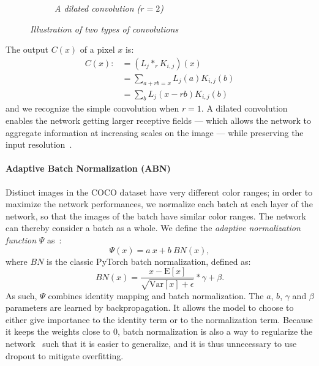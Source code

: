 \documentclass{article}
\begin{document}
\begin{figure}[!ht]
\begin{subfigure}{.49\linewidth}
                    \caption{\textit{A dilated convolution ($r=2$)}}
                    \label{fig:conv-dilated}
                \end{subfigure}
                \caption{\textit{Illustration of two types of convolutions}}
            \end{figure}

            \noindent The output $C(x)$ of a pixel $x$ is:
            \begin{align*}
            C(x):& = (L_j*_r K_{i,j})(x) \\
                 & = \sum_{a+rb=x}L_j(a)K_{i,j}(b) \\
                 & = \sum_b L_j(x-rb)K_{i,j}(b)
            \end{align*}
            and we recognize the simple convolution when $r=1$. A dilated convolution enables the network getting larger receptive fields --- which allows the network to aggregate information at increasing scales on the image --- while preserving the input resolution~\cite{yu2015}.


            \paragraph{Adaptive Batch Normalization (ABN)} Distinct images in the COCO dataset have very different color ranges; in order to maximize the network performances, we normalize each batch at each layer of the network, so that the images of the batch have similar color ranges. The network can thereby consider a batch as a whole. We define the \textit{adaptive normalization function} $\Psi$ as~\cite{chen2017}:
            $$\Psi(x)=a\ x+b\ BN(x),$$
            where $BN$ is the classic PyTorch batch normalization, defined as:
            $$BN(x) = \frac{x-\mathrm{E}[x]}{\sqrt{\mathrm{Var}[x]+\epsilon}}*\gamma+\beta.$$
            As such, $\Psi$ combines identity mapping and batch normalization. The $a$, $b$, $\gamma$ and $\beta$ parameters are learned by backpropagation. It allows the model to choose to either give importance to the identity term or to the normalization term. Because it keeps the weights close to 0, batch normalization is also a way to regularize the network~\cite{ioffe2015} such that it is easier to generalize, and it is thus unnecessary to use dropout to mitigate overfitting.
\end{document}
